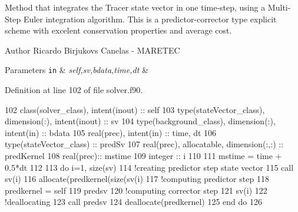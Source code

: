 Method that integrates the Tracer state vector in one time-\/step, using a Multi-\/\+Step Euler integration algorithm. This is a predictor-\/corrector type explicit scheme with excelent conservation properties and average cost. 

\begin{DoxyAuthor}{Author}
Ricardo Birjukovs Canelas -\/ M\+A\+R\+E\+T\+EC 
\end{DoxyAuthor}

\begin{DoxyParams}[1]{Parameters}
\mbox{\tt in}  & {\em self,sv,bdata,time,dt} & \\
\hline
\end{DoxyParams}


Definition at line 102 of file solver.\+f90.


\begin{DoxyCode}
102     \textcolor{keywordtype}{class}(solver\_class), \textcolor{keywordtype}{intent(inout)} :: self
103     \textcolor{keywordtype}{type}(stateVector\_class), \textcolor{keywordtype}{dimension(:)}, \textcolor{keywordtype}{intent(inout)} :: sv
104     \textcolor{keywordtype}{type}(background\_class), \textcolor{keywordtype}{dimension(:)}, \textcolor{keywordtype}{intent(in)} :: bdata
105     \textcolor{keywordtype}{real(prec)}, \textcolor{keywordtype}{intent(in)} :: time, dt
106     \textcolor{keywordtype}{type}(stateVector\_class) :: predSv
107     \textcolor{keywordtype}{real(prec)}, \textcolor{keywordtype}{allocatable}, \textcolor{keywordtype}{dimension(:,:)} :: predKernel
108     \textcolor{keywordtype}{real(prec)}:: mstime
109     \textcolor{keywordtype}{integer} :: i
110 
111     mstime = time + 0.5*dt
112 
113     \textcolor{keywordflow}{do} i=1, \textcolor{keyword}{size}(sv)
114         \textcolor{comment}{!creating predictor step state vector}
115         \textcolor{keyword}{call }sv(i)%
116         \textcolor{keyword}{allocate}(predkernel(\textcolor{keyword}{size}(sv(i)%
117         \textcolor{comment}{!computing predictor step}
118         predkernel = self%
119         predsv%
120         \textcolor{comment}{!computing corrector step}
121         sv(i)%
122         \textcolor{comment}{!deallocating}
123         \textcolor{keyword}{call }predsv%
124         \textcolor{keyword}{deallocate}(predkernel)
125 \textcolor{keywordflow}{    end do}
126 
\end{DoxyCode}
\mbox{\label{namespacesolver__mod_a11436fc89bf6c713930a83b5cc52a0cd}} 
